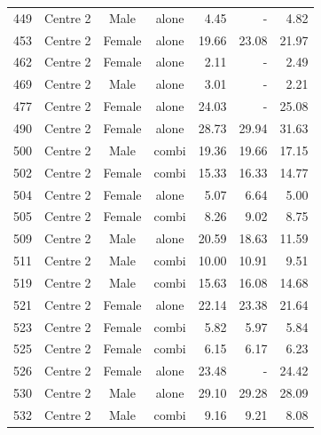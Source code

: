\begin{table}[p]
\begin{tabular}{|cccc|rrr|}
449&Centre 2&Male&alone&4.45&-&4.82\\
453&Centre 2&Female&alone&19.66&23.08&21.97\\
462&Centre 2&Female&alone&2.11&-&2.49\\
469&Centre 2&Male&alone&3.01&-&2.21\\
477&Centre 2&Female&alone&24.03&-&25.08\\
490&Centre 2&Female&alone&28.73&29.94&31.63\\
500&Centre 2&Male&combi&19.36&19.66&17.15\\
502&Centre 2&Female&combi&15.33&16.33&14.77\\
504&Centre 2&Female&alone&5.07&6.64&5.00\\
505&Centre 2&Female&combi&8.26&9.02&8.75\\
509&Centre 2&Male&alone&20.59&18.63&11.59\\
511&Centre 2&Male&combi&10.00&10.91&9.51\\
519&Centre 2&Male&combi&15.63&16.08&14.68\\
521&Centre 2&Female&alone&22.14&23.38&21.64\\
523&Centre 2&Female&combi&5.82&5.97&5.84\\
525&Centre 2&Female&combi&6.15&6.17&6.23\\
526&Centre 2&Female&alone&23.48&-&24.42\\
530&Centre 2&Male&alone&29.10&29.28&28.09\\
532&Centre 2&Male&combi&9.16&9.21&8.08\\
\hline
\end{tabular}
\end{table}

